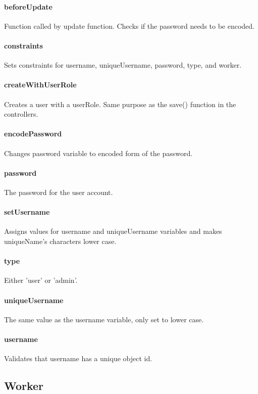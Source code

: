 \documentclass[12pt]{article}
\begin{document}
\paragraph{beforeUpdate} Function called by update function. Checks if the password needs to be encoded.
\paragraph{constraints} Sets constraints for username, uniqueUsername, password, type, and worker.
\paragraph{createWithUserRole} Creates a user with a userRole. Same purpose as the save() function in the controllers.
\paragraph{encodePassword} Changes password variable to encoded form of the password.
\paragraph{password} The password for the user account.
\paragraph{setUsername} Assigns values for username and uniqueUsername variables and makes uniqueName's characters lower case.
\paragraph{type} Either 'user' or 'admin'.
\paragraph{uniqueUsername} The same value as the username variable, only set to lower case.
\paragraph{username} Validates that username has a unique object id.

\setcounter{paragraph}{0}
\subsection{Worker}\label{sec:DWorker}
\end{document}
